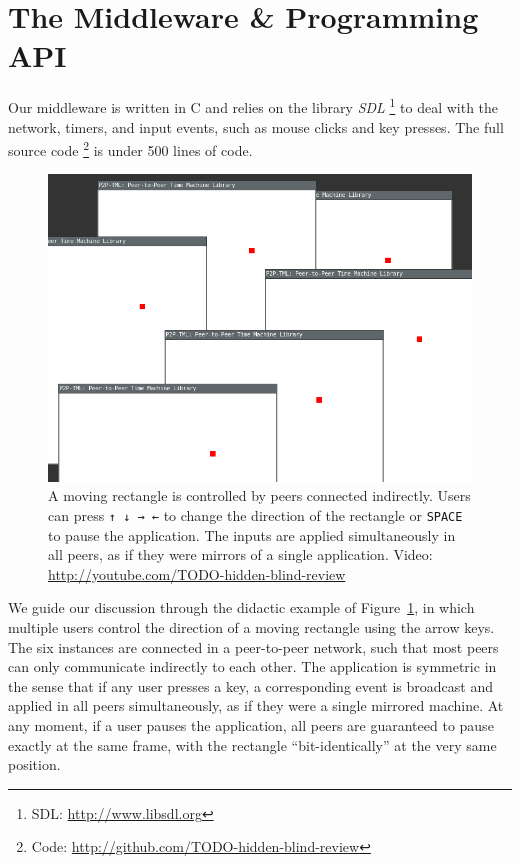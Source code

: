 \documentclass[10pt,journal,compsoc]{IEEEtran}
\newcommand{\code}[1]  {\texttt{\small{#1}}}
\begin{document}
\section{The Middleware \& Programming API}
\label{sec.tml}

Our middleware is written in C and relies on the library \emph{SDL}%
\footnote{SDL: \url{http://www.libsdl.org}}
to deal with the network, timers, and input events, such as mouse clicks and
key presses.
The full source code%
\footnote{Code: \url{http://github.com/TODO-hidden-blind-review}}
is under 500 lines of code.

\begin{figure}
    \centering
    \includegraphics[width=\linewidth]{move}
    \caption[XXX] {
        A moving rectangle is controlled by peers connected indirectly.
        Users can press \code{↑ ↓ → ←} to change the direction of the
        rectangle or \code{SPACE} to pause the application.
        The inputs are applied simultaneously in all peers, as if they were
        mirrors of a single application.
        Video: \url{http://youtube.com/TODO-hidden-blind-review}
        \label{fig.move}
    }
\end{figure}

We guide our discussion through the didactic example of Figure~\ref{fig.move},
in which multiple users control the direction of a moving rectangle using the
arrow keys.
The six instances are connected in a peer-to-peer network, such that most
peers can only communicate indirectly to each other.
%
The application is symmetric in the sense that if any user presses a key, a
corresponding event is broadcast and applied in all peers simultaneously, as
if they were a single mirrored machine.
At any moment, if a user pauses the application, all peers are guaranteed to
pause exactly at the same frame, with the rectangle ``bit-identically'' at the
very same position.
\end{document}
